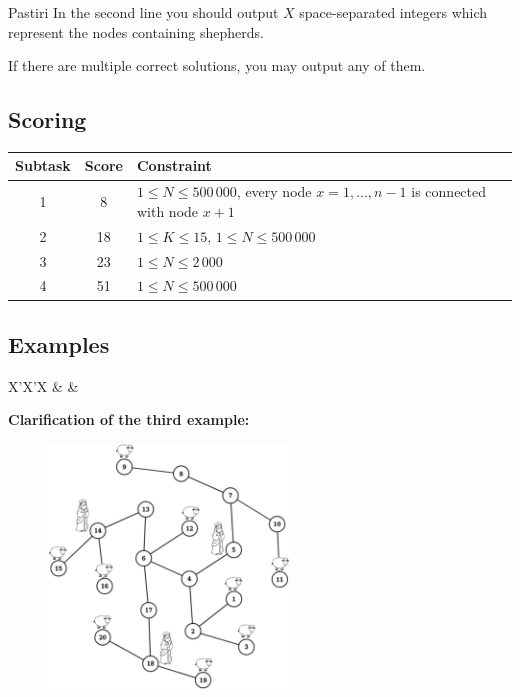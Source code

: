 \begin{statement}[
  problempoints=100,
  timelimit=1 second,
  memorylimit=512 MiB,
]{Pastiri}
In the second line you should output $X$ space-separated integers which
represent the nodes containing shepherds.

If there are multiple correct solutions, you may output any of them.

\subsection*{Scoring}
{\renewcommand{\arraystretch}{1.4}
  \setlength{\tabcolsep}{6pt}
  \begin{tabular}{ccl}
 Subtask & Score & Constraint \\ \midrule
  1 & 8 & $1 \le N \le 500\,000$, every node $x = 1, \dots, n-1$ is connected with node $x + 1$\\
  2 & 18 & $1 \le K \le 15 $, $1 \le N \le 500\,000$ \\
  3 & 23 & $1 \le N \le 2\,000$ \\
  4 & 51 & $1 \le N \le 500\,000$ \\
\end{tabular}}

\subsection*{Examples}
\begin{tabularx}{\textwidth}{X'X'X}
 &
 &
\end{tabularx}

\textbf{Clarification of the third example:}
\begin{figure}[H]
\centering
\includegraphics[width=0.57\textwidth]{img/pastiri_tp.png}
\end{figure}

\end{statement}

